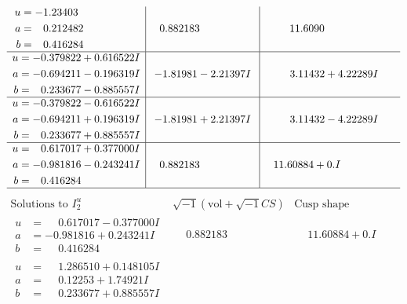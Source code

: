 \documentclass[1p]{elsarticle_modified}
\theoremstyle{definition}
\newcommand{\I}{\sqrt{-1}}
\begin{document}
$$\begin{array}{c|c|c}
\begin{aligned}
u &= -1.23403\phantom{ +0.000000I} \\
a &= \phantom{-}0.212482\phantom{ +0.000000I} \\
b &= \phantom{-}0.416284\phantom{ +0.000000I}\end{aligned}
 & \phantom{-}0.882183\phantom{ +0.000000I} & \phantom{-}11.6090\phantom{ +0.000000I} \\ \hline\begin{aligned}
u &= -0.379822 + 0.616522 I \\
a &= -0.694211 - 0.196319 I \\
b &= \phantom{-}0.233677 - 0.885557 I\end{aligned}
 & -1.81981 - 2.21397 I & \phantom{-}3.11432 + 4.22289 I \\ \hline\begin{aligned}
u &= -0.379822 - 0.616522 I \\
a &= -0.694211 + 0.196319 I \\
b &= \phantom{-}0.233677 + 0.885557 I\end{aligned}
 & -1.81981 + 2.21397 I & \phantom{-}3.11432 - 4.22289 I \\ \hline\begin{aligned}
u &= \phantom{-}0.617017 + 0.377000 I \\
a &= -0.981816 - 0.243241 I \\
b &= \phantom{-}0.416284\phantom{ +0.000000I}\end{aligned}
 & \phantom{-}0.882183\phantom{ +0.000000I} & \phantom{-}11.60884 + 0. I\phantom{ +0.000000I}\\
 \hline 
 \end{array}$$\newpage$$\begin{array}{c|c|c}  
\text{Solutions to }I^u_{2}& \I (\text{vol} + \sqrt{-1}CS) & \text{Cusp shape}\\
 \hline 
\begin{aligned}
u &= \phantom{-}0.617017 - 0.377000 I \\
a &= -0.981816 + 0.243241 I \\
b &= \phantom{-}0.416284\phantom{ +0.000000I}\end{aligned}
 & \phantom{-}0.882183\phantom{ +0.000000I} & \phantom{-}11.60884 + 0. I\phantom{ +0.000000I} \\ \hline\begin{aligned}
u &= \phantom{-}1.286510 + 0.148105 I \\
a &= \phantom{-}0.12253 + 1.74921 I \\
b &= \phantom{-}0.233677 + 0.885557 I\end{aligned}

\end{array}$$
\end{document}
